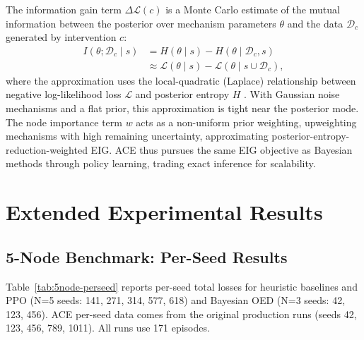 The information gain term $\Delta\mathcal{L}(c)$ is a Monte Carlo estimate of the mutual information between the posterior over mechanism parameters $\theta$ and the data $\mathcal{D}_c$ generated by intervention $c$:
\begin{align}
I(\theta; \mathcal{D}_c \mid s) &= H(\theta \mid s) - H(\theta \mid \mathcal{D}_c, s) \\
&\approx \mathcal{L}(\theta \mid s) - \mathcal{L}(\theta \mid s \cup \mathcal{D}_c),
\end{align}
where the approximation uses the local-quadratic (Laplace) relationship between negative log-likelihood loss $\mathcal{L}$ and posterior entropy $H$ \citep{rainforth2024modern}. With Gaussian noise mechanisms and a flat prior, this approximation is tight near the posterior mode. The node importance term $w$ acts as a non-uniform prior weighting, upweighting mechanisms with high remaining uncertainty, approximating posterior-entropy-reduction-weighted EIG. ACE thus pursues the same EIG objective as Bayesian methods through policy learning, trading exact inference for scalability.

\section{Extended Experimental Results}
\label{app:experiments}

\subsection{5-Node Benchmark: Per-Seed Results}
\label{app:5node-detail}

Table~\ref{tab:5node-perseed} reports per-seed total losses for heuristic baselines and PPO (N=5 seeds: 141, 271, 314, 577, 618) and Bayesian OED (N=3 seeds: 42, 123, 456). ACE per-seed data comes from the original production runs (seeds 42, 123, 456, 789, 1011). All runs use 171 episodes.

